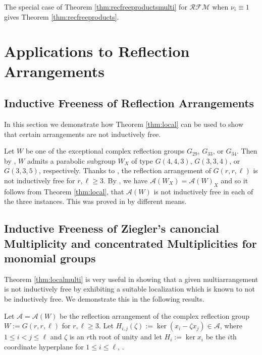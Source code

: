 The special case of Theorem \ref{thm:recfreeproductsmulti} for ${{\mathcal {RFM}}}$
when $\nu_i \equiv 1$ gives Theorem \ref{thm:recfreeproducts}.

\section{Applications to Reflection Arrangements}
\label{sec:appl}

\subsection{Inductive Freeness of Reflection Arrangements}
\label{ssec:reflection}

In this section we demonstrate how 
Theorem \ref{thm:local} can be used to 
show that certain arrangements are not inductively free.

Let $W$ be one of the exceptional complex reflection groups 
$G_{29}$, $G_{33}$,  or $G_{34}$.
Then by 
\cite[Tables C.10, C.14, C.15]{orlikterao:arrangements},
$W$ admits a parabolic subgroup $W_X$ of type 
$G(4,4,3)$, $G(3,3,4)$, or $G(3,3,5)$, respectively.
Thanks to  \cite[Prop.\ 3.2]{hogeroehrle:indfree}, the 
reflection arrangement of 
$G(r,r, \ell)$ is not inductively free 
for $r, \ell \ge 3$.
By \cite[Cor.\ 6.28]{orlikterao:arrangements},
we have
${{\mathcal A}}(W_X) = {{\mathcal A}}(W)_X$ and so it follows from 
Theorem \ref{thm:local}, that ${{\mathcal A}}(W)$
is not inductively free in each of the three instances.
This was proved in 
\cite[\S 3.1.4]{hogeroehrle:indfree} by different means.
 
\subsection{Inductive Freeness 
of Ziegler's canoncial Multiplicity 
and concentrated Multiplicities 
for monomial groups}
\label{ssec:grrl}

Theorem \ref{thm:localmulti} is very useful in 
showing that a given 
multiarrangement is not inductively free by exhibiting a 
suitable localization which is known to not be inductively free. 
We demonstrate this in the following results.

Let ${{\mathcal A}} = {{\mathcal A}}(W)$ be the reflection arrangement of 
the complex reflection group $W := G(r,r, \ell)$
for $r, \ell \ge 3$.
Let $H_{i,j}(\zeta) := \ker(x_i - \zeta x_j) \in {{\mathcal A}}$,
where $1 \le i < j \le \ell$ and $\zeta$ is an $r$th root of unity
and 
let $H_i :=\ker x_i$ be the $i$th coordinate hyperplane for $1 \le i \le \ell$,
\cite[\S 6.4]{orlikterao:arrangements}.

